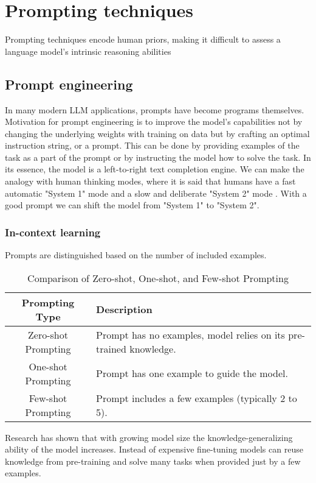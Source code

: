\section{Prompting techniques}

Prompting techniques encode human priors, making it difficult to assess a language model's intrinsic reasoning abilities \cite{wang2024chainofthoughtreasoningprompting}

\subsection{Prompt engineering}
In many modern LLM applications, prompts have become programs themselves. \cite{schnabel2024symbolicpromptprogramsearch}
Motivation for prompt engineering is to improve the model's capabilities not by changing the underlying weights with training on data but by crafting an optimal instruction string, or a prompt.
This can be done by providing examples of the task as a part of the prompt or by instructing the model how to solve the task.
In its essence, the model is a left-to-right text completion engine. We can make the analogy with human thinking modes, where it is said that humans
have a fast automatic "System 1" mode and a slow and deliberate "System 2" mode \cite{yao2023treethoughtsdeliberateproblem}. 
With a good prompt we can shift the model from "System 1" to "System 2".
\subsubsection{In-context learning}
Prompts are distinguished based on the number of included examples.
\begin{table}[h!]
    \centering
    \begin{tabular}{|c|p{12cm}|}
    \hline
    \textbf{Prompting Type} & \textbf{Description} \\
    \hline
    Zero-shot Prompting & Prompt has no examples, model relies on its pre-trained knowledge. \\
    \hline
    One-shot Prompting & Prompt has one example to guide the model. \\
    \hline
    Few-shot Prompting & Prompt includes a few examples (typically 2 to 5). \\
    \hline
    \end{tabular}
    \caption{Comparison of Zero-shot, One-shot, and Few-shot Prompting}
\end{table}        
Research\cite{brown2020languagemodelsfewshotlearners} has shown that with growing model size the knowledge-generalizing ability of the model increases. Instead of expensive fine-tuning
models can reuse knowledge from pre-training and solve many tasks when provided just by a few examples.

